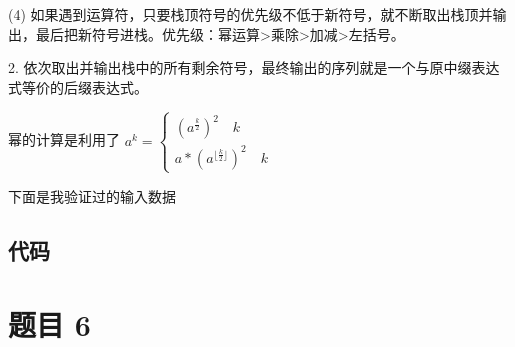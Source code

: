 \documentclass[cs4size,a4paper]{ctexart}
\begin{document}
	(4) 如果遇到运算符，只要栈顶符号的优先级不低于新符号，就不断取出栈顶并输出，最后把新符号进栈。优先级：幂运算>乘除>加减>左括号。
	
	2. 依次取出并输出栈中的所有剩余符号，最终输出的序列就是一个与原中缀表达式等价的后缀表达式。
	
	
	幂的计算是利用了 $a^k=\begin{cases}(a^{\frac{k}{2}})^2 \quad k\\a*(a^{\lfloor\frac{k}{2}\rfloor})^2 \quad k \end{cases}$
	
	下面是我验证过的输入数据
	
	\subsection{代码}
	
	
	
	\section{题目 6}
	\fi
	
\end{document}
